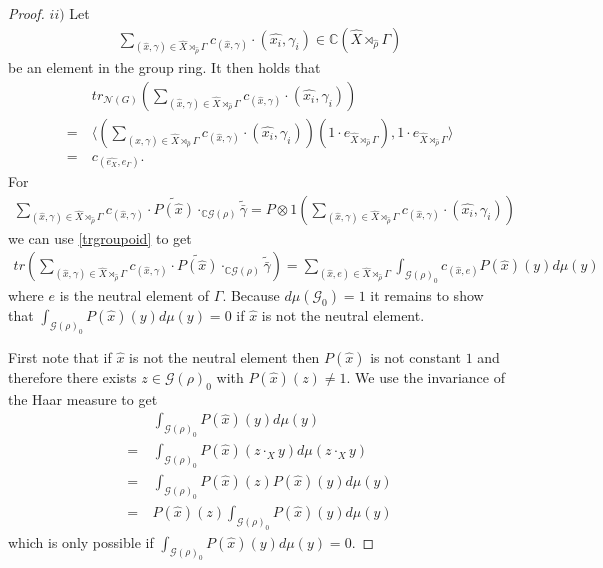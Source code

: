 \documentclass[12pt,a4paper]{scrartcl}
\theoremstyle{plain}
\theoremstyle{definition}
\numberwithin{equation}{section}
\newcommand{\C}{\mathbb{C}} %
\newcommand{\2}{\mathbb{Z} / 2 \mathbb{Z}}
\newcommand{\G}{\mathcal{G}}
\newcommand{\1}{\bar{1}}
\newcommand{\0}{\bar{0}}
\begin{document}
\begin{proof}
	$ii)$ Let 
	\begin{align*}
		\sum_{(\hat{x}, \gamma) \in \hat{X} \rtimes_{\hat{\rho}} \Gamma} c_{(\hat{x}, \gamma)} \cdot (\hat{x_i}, \gamma_i) \in \C(\hat{X} \rtimes_{\hat{\rho}} \Gamma)
	\end{align*}
	be an element in the group ring. It then holds that
	\begin{align*}
		 &~ tr_{\mathcal{N}(G)}(\sum_{(\hat{x}, \gamma) \in \hat{X} \rtimes_{\hat{\rho}} \Gamma} c_{(\hat{x}, \gamma)} \cdot (\hat{x_i}, \gamma_i)) \\
		=&~ \langle (\sum_{(\hat{x}, \gamma) \in \hat{X} \rtimes_{\hat{\rho}} \Gamma} c_{(\hat{x}, \gamma)} \cdot (\hat{x_i}, \gamma_i))(1 \cdot e_{\hat{X} \rtimes_{\hat{\rho}} \Gamma}), 1 \cdot e_{\hat{X} \rtimes_{\hat{\rho}} \Gamma} \rangle \\
		=&~ c_{(\hat{e_X}, e_\Gamma)}.
	\end{align*}
	For 
	\begin{align*}
		\sum_{(\hat{x}, \gamma) \in \hat{X} \rtimes_{\hat{\rho}} \Gamma} c_{(\hat{x}, \gamma)} \cdot \widetilde{P(\hat{x})} \cdot_{\C\G(\rho)} \widetilde{\bar{\gamma}} = P \otimes 1 (\sum_{(\hat{x}, \gamma) \in \hat{X} \rtimes_{\hat{\rho}} \Gamma} c_{(\hat{x}, \gamma)} \cdot (\hat{x_i}, \gamma_i))
	\end{align*}
	we can use \ref{trgroupoid} to get
	\begin{align*}
		tr(\sum_{(\hat{x}, \gamma) \in \hat{X} \rtimes_{\hat{\rho}} \Gamma} c_{(\hat{x}, \gamma)} \cdot \widetilde{P(\hat{x})} \cdot_{\C\G(\rho)} \widetilde{\bar{\gamma}}) = \sum_{(\hat{x}, e) \in \hat{X} \rtimes_{\hat{\rho}} \Gamma} \int_{\mathcal{G(\rho)}_0} c_{(\hat{x}, e)} P(\hat{x})(y) d\mu(y)
	\end{align*}
	where $e$ is the neutral element of $\Gamma$. Because $d \mu(\G_0) = 1$ it remains to show that $\int_{\G(\rho)_0} P(\hat{x})(y) d\mu(y) = 0$ if $\hat{x}$ is not the neutral element.
	
	First note that if $\hat{x}$ is not the neutral element then $P(\hat{x})$ is not constant $1$ and therefore there exists $z \in \G(\rho)_0$ with $P(\hat{x})(z) \neq 1$. We use the invariance of the Haar measure to get
	\begin{align*}
		 &~ \int_{\G(\rho)_0} P(\hat{x})(y) d\mu(y) \\
		=&~ \int_{\G(\rho)_0} P(\hat{x})(z \cdot_{X} y) d\mu(z \cdot_{X} y) \\
		=&~ \int_{\G(\rho)_0} P(\hat{x})(z) P(\hat{x})(y) d\mu(y) \\
		=&~ P(\hat{x})(z) \int_{\G(\rho)_0} P(\hat{x})(y) d\mu(y)
	\end{align*}
	which is only possible if $\int_{\G(\rho)_0} P(\hat{x})(y) d\mu(y) = 0$.
	

\end{proof}
\end{document}
